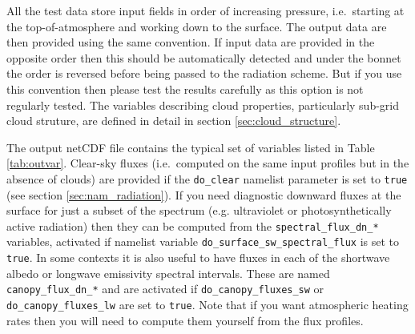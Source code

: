 \documentclass[a4,oneside]{article}
\def\codesize{\small}
\def\code#1{{\codesize\texttt{#1}}}
\begin{document}
All the test data store input fields in order of increasing pressure,
i.e.\ starting at the top-of-atmosphere and working down to the
surface. The output data are then provided using the same
convention. If input data are provided in the opposite order then this
should be automatically detected and under the bonnet the order is
reversed before being passed to the radiation scheme. But if you use
this convention then please test the results carefully as this option
is not regularly tested. The variables describing cloud properties,
particularly sub-grid cloud struture, are defined in detail in section
\ref{sec:cloud_structure}.

The output netCDF file contains the typical set of variables listed in
Table \ref{tab:outvar}. Clear-sky fluxes (i.e.\ computed on the same
input profiles but in the absence of clouds) are provided if the
\code{do\_clear} namelist parameter is set to \code{true} (see section
\ref{sec:nam_radiation}). If you need diagnostic downward fluxes at
the surface for just a subset of the spectrum (e.g. ultraviolet or
photosynthetically active radiation) then they can be computed from
the \code{spectral\_flux\_dn\_*} variables, activated if namelist
variable \code{do\_surface\_sw\_spectral\_flux} is set to
\code{true}. In some contexts it is also useful to have fluxes in each
of the shortwave albedo or longwave emissivity spectral intervals.
These are named \code{canopy\_flux\_dn\_*} and are activated if
\code{do\_canopy\_fluxes\_sw} or \code{do\_canopy\_fluxes\_lw} are set
to \code{true}. Note that if you want atmospheric heating rates then
you will need to compute them yourself from the flux profiles.
\end{document}
